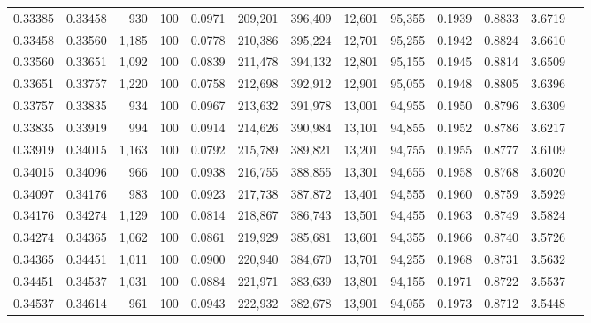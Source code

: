 \begin{tabular}{rrrrrrrrrrrrr}
0.33385 & 0.33458 &   930 & 100 &                                     0.0971 & 209,201 & 396,409 &  12,601 &  95,355 & 0.1939 & 0.8833 & 3.6719 \\
0.33458 & 0.33560 & 1,185 & 100 &                                     0.0778 & 210,386 & 395,224 &  12,701 &  95,255 & 0.1942 & 0.8824 & 3.6610 \\
0.33560 & 0.33651 & 1,092 & 100 &                                     0.0839 & 211,478 & 394,132 &  12,801 &  95,155 & 0.1945 & 0.8814 & 3.6509 \\
0.33651 & 0.33757 & 1,220 & 100 &                                     0.0758 & 212,698 & 392,912 &  12,901 &  95,055 & 0.1948 & 0.8805 & 3.6396 \\
0.33757 & 0.33835 &   934 & 100 &                                     0.0967 & 213,632 & 391,978 &  13,001 &  94,955 & 0.1950 & 0.8796 & 3.6309 \\
0.33835 & 0.33919 &   994 & 100 &                                     0.0914 & 214,626 & 390,984 &  13,101 &  94,855 & 0.1952 & 0.8786 & 3.6217 \\
0.33919 & 0.34015 & 1,163 & 100 &                                     0.0792 & 215,789 & 389,821 &  13,201 &  94,755 & 0.1955 & 0.8777 & 3.6109 \\
0.34015 & 0.34096 &   966 & 100 &                                     0.0938 & 216,755 & 388,855 &  13,301 &  94,655 & 0.1958 & 0.8768 & 3.6020 \\
0.34097 & 0.34176 &   983 & 100 &                                     0.0923 & 217,738 & 387,872 &  13,401 &  94,555 & 0.1960 & 0.8759 & 3.5929 \\
0.34176 & 0.34274 & 1,129 & 100 &                                     0.0814 & 218,867 & 386,743 &  13,501 &  94,455 & 0.1963 & 0.8749 & 3.5824 \\
0.34274 & 0.34365 & 1,062 & 100 &                                     0.0861 & 219,929 & 385,681 &  13,601 &  94,355 & 0.1966 & 0.8740 & 3.5726 \\
0.34365 & 0.34451 & 1,011 & 100 &                                     0.0900 & 220,940 & 384,670 &  13,701 &  94,255 & 0.1968 & 0.8731 & 3.5632 \\
0.34451 & 0.34537 & 1,031 & 100 &                                     0.0884 & 221,971 & 383,639 &  13,801 &  94,155 & 0.1971 & 0.8722 & 3.5537 \\
0.34537 & 0.34614 &   961 & 100 &                                     0.0943 & 222,932 & 382,678 &  13,901 &  94,055 & 0.1973 & 0.8712 & 3.5448 \\

\end{tabular}
